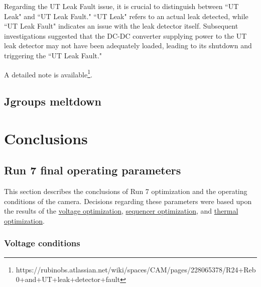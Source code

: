 Regarding the UT Leak Fault issue, it is crucial to distinguish between ``UT Leak" and ``UT Leak Fault." ``UT Leak" refers to an actual leak detected, while ``UT Leak Fault" indicates an issue with the leak detector itself. Subsequent investigations suggested that the DC-DC converter supplying power to the UT leak detector may not have been adequately loaded, leading to its shutdown and triggering the ``UT Leak Fault."

A detailed note is available\footnote{https://rubinobs.atlassian.net/wiki/spaces/CAM/pages/228065378/R24+Reb0+and+UT+leak+detector+fault}.

\subsection{Jgroups meltdown}

\section{Conclusions}\label{conclusions}

\subsection{Run 7 final operating
parameters}\label{run-7-final-operating-parameters}

This section describes the conclusions of Run 7 optimization and the
operating conditions of the camera. Decisions regarding these parameters
were based upon the results of the
\href{https://sitcomtn-148.lsst.io/\#persistence-optimization}{voltage
optimization},
\href{https://sitcomtn-148.lsst.io/\#sequencer-optimization}{sequencer
optimization}, and
\href{https://sitcomtn-148.lsst.io/\#thermal-optimization}{thermal
optimization}.

\subsubsection{Voltage conditions}\label{voltage-conditions}

